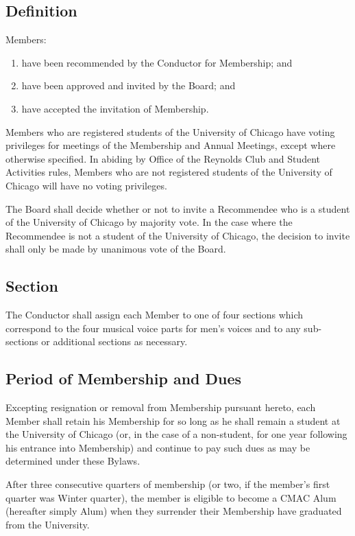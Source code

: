 \documentclass{article}
\begin{document}
\subsection{Definition}

Members:
\begin{enumerate}
  \item have been recommended by the Conductor for Membership; and
  \item have been approved and invited by the Board; and
  \item have accepted the invitation of Membership.
\end{enumerate}
Members who are registered students of the University of Chicago have voting
privileges for meetings of the Membership and Annual Meetings, except where
otherwise specified.  In abiding by Office of the Reynolds Club and Student
Activities rules, Members who are not registered students of the University of
Chicago will have no voting privileges.

The Board shall decide whether or not to invite a Recommendee who is a student
of the University of Chicago by majority vote. In the case where the Recommendee
is not a student of the University of Chicago, the decision to invite shall only
be made by unanimous vote of the Board.

\subsection{Section}

The Conductor shall assign each Member to one of four sections which
correspond to the four musical voice parts for men's voices and to
any sub-sections or additional sections as necessary.

\subsection{Period of Membership and Dues}

Excepting resignation or removal from Membership pursuant hereto,
each Member shall retain his Membership for so long as he shall remain
a student at the University of Chicago (or, in the case of a non-student,
for one year following his entrance into Membership) and continue
to pay such dues as may be determined under these Bylaws.

After three consecutive quarters of membership (or two, if the member's first
quarter was Winter quarter), the member is eligible to become a CMAC Alum
(hereafter simply Alum) when they surrender their Membership have graduated from
the University.
\end{document}
